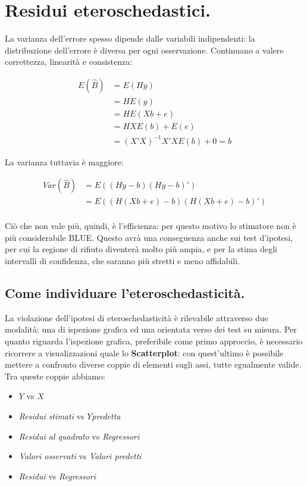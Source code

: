 \documentclass[11pt, twocolumn]{article}
\begin{document}
\section{Residui eteroschedastici.}
La varianza dell'errore spesso dipende dalle variabili indipendenti: la distribuzione dell'errore è diversa per ogni osservazione.
Continuano a valere correttezza, linearità e consistenza:

\begin{align*}
  E(\hat{B}) &= E(Hy) \\
             &= H E(y) \\
             &= H E(Xb + e) \\
             &= H X E(b) + E(e) \\
             &= (X'X)^{-1}X'X E(b) + 0 = b
\end{align*}

La varianza tuttavia è maggiore:

\begin{align*}
  Var(\hat{B}) &= E((Hy - b)(Hy - b)') \\
               &= E((H(Xb + e) - b)(H(Xb + e) - b)') \\
\end{align*}

Ciò che non vale più, quindi, è l'efficienza: per questo motivo lo stimatore non è più considerabile BLUE. Questo avrà una conseguenza anche sui test d'ipotesi, per cui la regione di rifiuto diventerà molto più ampia, e per la stima degli intervalli di confidenza, che saranno più stretti e meno affidabili.

\subsection*{Come individuare l'eteroschedasticità.}
La violazione dell'ipotesi di eteroschedasticità è rilevabile attraverso due modalità: una di ispezione grafica ed una orientata verso dei test su misura.
Per quanto riguarda l'ispezione grafica, preferibile come primo approccio, è necessario ricorrere a visualizzazioni quale lo \textbf{Scatterplot}: con quest'ultimo è possibile mettere a confronto diverse coppie di elementi sugli assi, tutte egualmente valide.
\newline
Tra queste coppie abbiamo:
\begin{itemize}
\item $Y$ vs $X$
\item \textit{Residui stimati} vs $Y$\textit{predetta}
\item \textit{Residui al quadrato} vs \textit{Regressori}
\item \textit{Valori osservati} vs \textit{Valori predetti}
\item \textit{Residui} vs \textit{Regressori}
\end{itemize}
\end{document}
